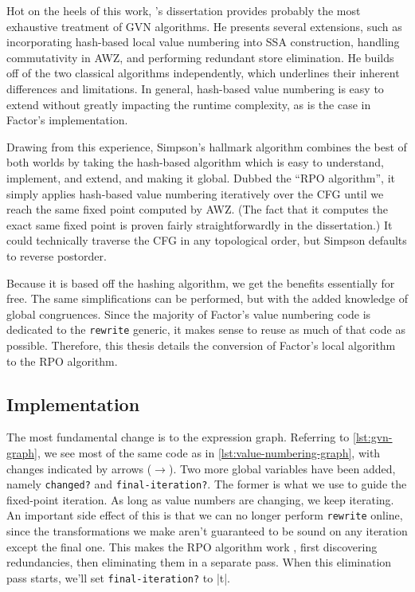Hot on the heels of this work, \citeauthor{Simpson}'s \autocite*{Simpson}
dissertation provides probably the most exhaustive treatment of \gls{GVN}
algorithms.  He presents several extensions, such as incorporating hash-based
local value numbering into \gls{SSA} construction, handling commutativity in
AWZ, and performing redundant store elimination.  He builds off of the two
classical algorithms independently, which underlines their inherent differences
and limitations.  In general, hash-based value numbering is easy to extend
without greatly impacting the runtime complexity, as is the case in Factor's
implementation.

Drawing from this experience, Simpson's hallmark algorithm combines the best of
both worlds by taking the hash-based algorithm which is easy to understand,
implement, and extend, and making it global.  Dubbed the ``\gls{RPO}
algorithm'', it simply applies hash-based value numbering iteratively over the
\gls{CFG} until we reach the same fixed point computed by AWZ.  (The fact that
it computes the exact same fixed point is proven fairly straightforwardly in
the dissertation.)  It could technically traverse the \gls{CFG} in any
topological order, but Simpson defaults to reverse postorder.

Because it is based off the hashing algorithm, we get the benefits essentially
for free.  The same simplifications can be performed, but with the added
knowledge of global congruences.  Since the majority of Factor's value
numbering code is dedicated to the \Verb|rewrite| generic, it makes sense to
reuse as much of that code as possible.  Therefore, this thesis details the
conversion of Factor's local algorithm to the \gls{RPO} algorithm.

\subsection{Implementation}

The most fundamental change is to the expression graph.  Referring to
\vref{lst:gvn-graph}, we see most of the same code as in
\vref{lst:value-numbering-graph}, with changes indicated by arrows
($\longrightarrow$).  Two more global variables have been added, namely
\Verb|changed?| and \Verb|final-iteration?|.  The former is what we use to
guide the fixed-point iteration.  As long as value numbers are changing, we
keep iterating.  An important side effect of this is that we can no longer
perform \Verb|rewrite| online, since the transformations we make aren't
guaranteed to be sound on any iteration except the final one.  This makes the
\gls{RPO} algorithm work , first discovering redundancies, then
eliminating them in a separate pass.  When this elimination pass starts, we'll
set \Verb|final-iteration?| to \factor|t|.

